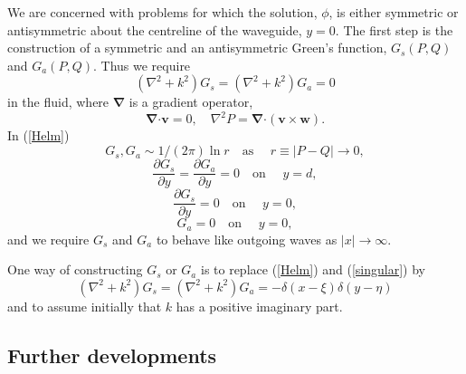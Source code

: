 \documentclass{jfm}
\providecommand\upi{\pi}%
\providecommand\upi{\pi}%
\providecommand\bnabla{\boldsymbol{\nabla}}
\providecommand\bcdot{\boldsymbol{\cdot}}
\newcommand\GaPQ{\ensuremath{G_a(P,Q)}}
\newcommand\GsPQ{\ensuremath{G_s(P,Q)}}
\newcommand\p{\ensuremath{\partial}}
\newcommand\tti{\ensuremath{\rightarrow\infty}}
\begin{document}
We are concerned with problems for which the solution, $\phi$, is
either symmetric or antisymmetric about the centreline of the
waveguide, $y=0$. The first step is the construction of a
symmetric and an antisymmetric Green's function, $\GsPQ$ and $\GaPQ$.
Thus we require
\begin{equation}
  (\nabla^2+k^2)G_s=(\nabla^2+k^2)G_a=0
  \label{Helm}
\end{equation}
in the fluid, where $\bnabla$ is a gradient operator,
\[
  \bnabla\bcdot\boldsymbol{v} = 0,\quad \nabla^{2}P=
    \bnabla\bcdot(\boldsymbol{v}\times \boldsymbol{w}).
\]
In (\ref{Helm})
\begin{equation}
  G_s,G_a\sim 1 / (2\upi)\ln r
  \quad \mbox{as\ }\quad r\equiv|P-Q|\rightarrow 0,
  \label{singular}
\end{equation}
\begin{equation}
  \frac{\p G_s}{\p y}=\frac{\p G_a}{\p y}=0
  \quad \mbox{on\ }\quad y=d,
  \label{wallbc}
\end{equation}
\begin{equation}
  \frac{\p G_s}{\p y}=0
  \quad \mbox{on\ }\quad y=0,
  \label{symbc}
\end{equation}
\begin{equation}
  G_a=0
  \quad \mbox{on\ }\quad y=0,
  \label{asymbc}
\end{equation}
and we require $G_s$ and $G_a$ to behave like outgoing waves as
$|x|\tti$.

One way of constructing $G_s$ or $G_a$ is to replace (\ref{Helm})
and (\ref{singular}) by
\begin{equation}
  (\nabla^2+k^2)G_s=(\nabla^2+k^2)G_a
  = -\delta(x-\xi)\delta(y-\eta)
\end{equation}
and to assume initially that $k$ has a positive imaginary part.


\subsection{Further developments}
\end{document}
